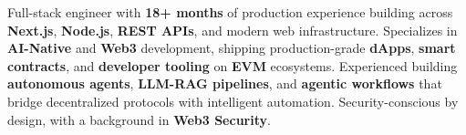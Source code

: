 \documentclass[letter,10pt]{article}
\begin{document}
Full-stack engineer with \textbf{18+ months} of production experience building across \textbf{Next.js}, \textbf{Node.js}, \textbf{REST APIs}, and modern web infrastructure. Specializes in \textbf{AI-Native} and \textbf{Web3} development, shipping production-grade \textbf{dApps}, \textbf{smart contracts}, and \textbf{developer tooling} on \textbf{EVM} ecosystems. Experienced building \textbf{autonomous agents}, \textbf{LLM-RAG pipelines}, and \textbf{agentic workflows} that bridge decentralized protocols with intelligent automation. Security-conscious by design, with a background in \textbf{Web3 Security}.
\end{document}
